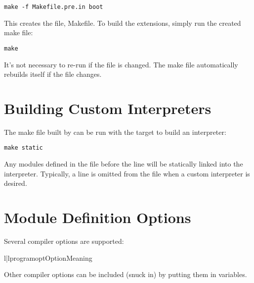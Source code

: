 \documentclass{manual}
\begin{document}
\begin{verbatim}
make -f Makefile.pre.in boot
\end{verbatim}

This creates the file, Makefile.  To build the extensions, simply
run the created make file:

\begin{verbatim}
make
\end{verbatim}

It's not necessary to re-run  if the
 file is changed.  The make file automatically rebuilds
itself if the  file changes.


\section{Building Custom Interpreters \label{custom-interps}}

The make file built by  can be run with the
 target to build an interpreter:

\begin{verbatim}
make static
\end{verbatim}

Any modules defined in the  file before the
 line will be statically linked into the interpreter.
Typically, a  line is omitted from the
 file when a custom interpreter is desired.


\section{Module Definition Options \label{module-defn-options}}

Several compiler options are supported:

\begin{tableii}{l|l}{programopt}{Option}{Meaning}
\end{tableii}

Other compiler options can be included (snuck in) by putting them
in variables.
\end{document}
